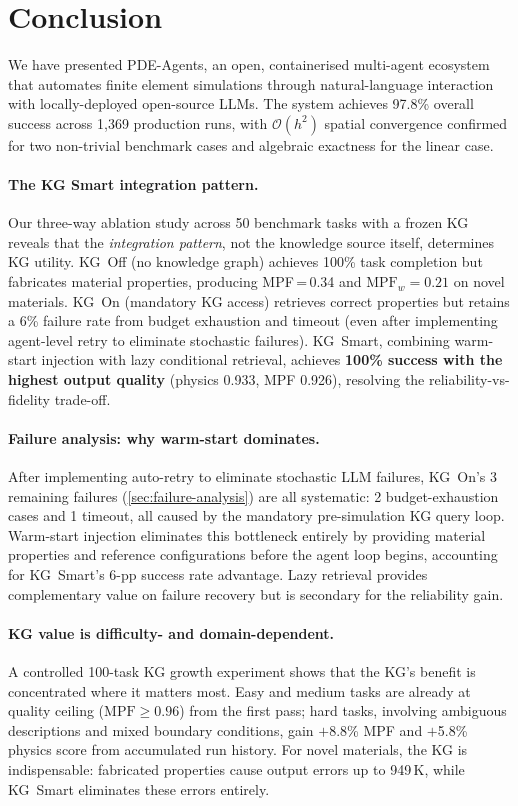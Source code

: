 \documentclass[preprint,review,12pt]{elsarticle}
\begin{document}
\section{Conclusion}
\label{sec:conclusion}

We have presented PDE-Agents, an open, containerised multi-agent ecosystem
that automates finite element simulations through natural-language interaction
with locally-deployed open-source LLMs.  The system achieves 97.8\% overall
success across 1{,}369 production runs, with $\mathcal{O}(h^2)$
spatial convergence confirmed for two non-trivial benchmark cases
and algebraic exactness for the linear case.

\paragraph{The KG Smart integration pattern.}
Our three-way ablation study across 50 benchmark tasks with a frozen KG
reveals that the \emph{integration pattern}, not the knowledge source
itself, determines KG utility.  KG~Off (no knowledge graph) achieves
100\% task completion but fabricates material properties, producing
MPF\,=\,0.34 and $\text{MPF}_w{=}0.21$ on novel materials.
KG~On (mandatory KG access) retrieves correct properties but retains
a 6\% failure rate from budget exhaustion and timeout (even after
implementing agent-level retry to eliminate stochastic failures).
KG~Smart, combining warm-start injection with lazy conditional
retrieval, achieves \textbf{100\% success with the highest output
quality} (physics 0.933, MPF 0.926), resolving the
reliability-vs-fidelity trade-off.

\paragraph{Failure analysis: why warm-start dominates.}
After implementing auto-retry to eliminate stochastic LLM failures,
KG~On's 3 remaining failures (\cref{sec:failure-analysis}) are all
systematic: 2 budget-exhaustion cases and 1 timeout, all caused by
the mandatory pre-simulation KG query loop.  Warm-start injection
eliminates this bottleneck entirely by providing material properties
and reference configurations before the agent loop begins,
accounting for KG~Smart's 6-pp success rate advantage.  Lazy retrieval
provides complementary value on failure recovery but is secondary
for the reliability gain.

\paragraph{KG value is difficulty- and domain-dependent.}
A controlled 100-task KG growth experiment shows that the KG's benefit
is concentrated where it matters most.  Easy and medium tasks are already
at quality ceiling ($\text{MPF}{\geq}0.96$) from the first pass; hard
tasks, involving ambiguous descriptions and mixed boundary conditions, gain
$+$8.8\% MPF and $+$5.8\% physics score from accumulated run history.
For novel materials, the KG is indispensable: fabricated properties cause
output errors up to 949\,K, while KG~Smart eliminates these errors entirely.
\end{document}
